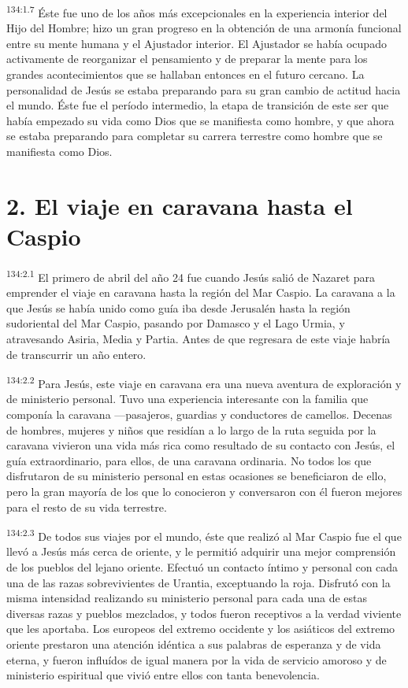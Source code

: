 \par
\textsuperscript{134:1.7} Éste fue uno de los años más excepcionales en la experiencia interior del Hijo del Hombre; hizo un gran progreso en la obtención de una armonía funcional entre su mente humana y el Ajustador interior. El Ajustador se había ocupado activamente de reorganizar el pensamiento y de preparar la mente para los grandes acontecimientos que se hallaban entonces en el futuro cercano. La personalidad de Jesús se estaba preparando para su gran cambio de actitud hacia el mundo. Éste fue el período intermedio, la etapa de transición de este ser que había empezado su vida como Dios que se manifiesta como hombre, y que ahora se estaba preparando para completar su carrera terrestre como hombre que se manifiesta como Dios.

\section*{2. El viaje en caravana hasta el Caspio}
\par
\textsuperscript{134:2.1} El primero de abril del año 24 fue cuando Jesús salió de Nazaret para emprender el viaje en caravana hasta la región del Mar Caspio. La caravana a la que Jesús se había unido como guía iba desde Jerusalén hasta la región sudoriental del Mar Caspio, pasando por Damasco y el Lago Urmia, y atravesando Asiria, Media y Partia. Antes de que regresara de este viaje habría de transcurrir un año entero.

\par
\textsuperscript{134:2.2} Para Jesús, este viaje en caravana era una nueva aventura de exploración y de ministerio personal. Tuvo una experiencia interesante con la familia que componía la caravana ---pasajeros, guardias y conductores de camellos. Decenas de hombres, mujeres y niños que residían a lo largo de la ruta seguida por la caravana vivieron una vida más rica como resultado de su contacto con Jesús, el guía extraordinario, para ellos, de una caravana ordinaria. No todos los que disfrutaron de su ministerio personal en estas ocasiones se beneficiaron de ello, pero la gran mayoría de los que lo conocieron y conversaron con él fueron mejores para el resto de su vida terrestre.

\par
\textsuperscript{134:2.3} De todos sus viajes por el mundo, éste que realizó al Mar Caspio fue el que llevó a Jesús más cerca de oriente, y le permitió adquirir una mejor comprensión de los pueblos del lejano oriente. Efectuó un contacto íntimo y personal con cada una de las razas sobrevivientes de Urantia, exceptuando la roja. Disfrutó con la misma intensidad realizando su ministerio personal para cada una de estas diversas razas y pueblos mezclados, y todos fueron receptivos a la verdad viviente que les aportaba. Los europeos del extremo occidente y los asiáticos del extremo oriente prestaron una atención idéntica a sus palabras de esperanza y de vida eterna, y fueron influídos de igual manera por la vida de servicio amoroso y de ministerio espiritual que vivió entre ellos con tanta benevolencia.

